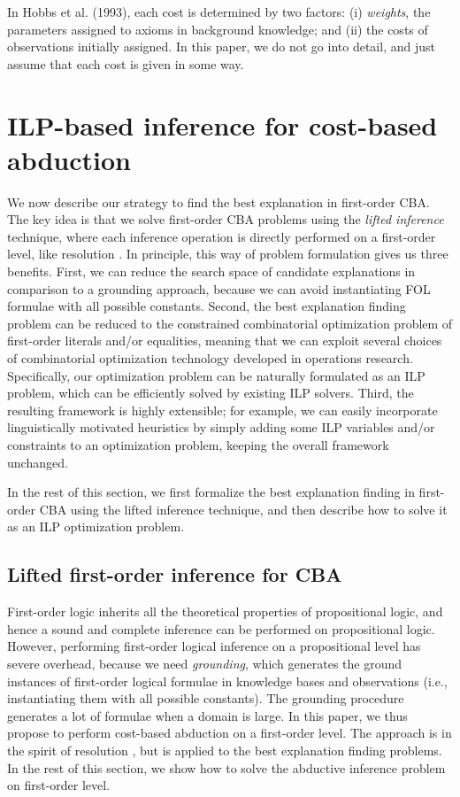 \documentclass[english]{jnlp_1.4}
\begin{document}
In Hobbs et al. (1993), each cost is determined by two factors: (i)
\emph{weights}, the parameters assigned to axioms in background
knowledge; and (ii) the costs of observations initially assigned. In
this paper, we do not go into detail, and just assume that each
cost is given in some way.


\section{ILP-based inference for cost-based abduction}
\label{sec:i_and_i}

We now describe our strategy to find the best explanation in
first-order CBA. The key idea is that we solve first-order CBA
problems using the \emph{lifted inference} technique, where each
inference operation is directly performed on a first-order level, like
resolution \cite{Robinson65}. In principle, this way of problem
formulation gives us three benefits. First, we can reduce the search
space of candidate explanations in comparison to a grounding approach,
because we can avoid instantiating FOL formulae with all
possible constants. Second, the best explanation finding problem can
be reduced to the constrained combinatorial optimization problem of
first-order literals and/or equalities, meaning that we can exploit
several choices of combinatorial optimization technology developed in
operations research. Specifically, our optimization problem can be
naturally formulated as an ILP problem,
which can be efficiently solved by existing ILP solvers. Third, the
resulting framework is highly extensible; for example, we can easily
incorporate linguistically motivated heuristics by simply adding some
ILP variables and/or constraints to an optimization problem, keeping
the overall framework unchanged.

In the rest of this section, we first formalize the best explanation
finding in first-order CBA using the lifted inference technique, and
then describe how to solve it as an ILP optimization problem.


\subsection{Lifted first-order inference for CBA}
\label{sec:liftedcba}

First-order logic inherits all the theoretical properties of
propositional logic, and hence a sound and complete inference can be
performed on propositional logic. However, performing first-order
logical inference on a propositional level has severe overhead, because
we need \emph{grounding}, which generates the ground instances of
first-order logical formulae in knowledge bases and observations
(i.e., instantiating them with all possible constants). The grounding
procedure generates a lot of formulae when a domain is
large. In this paper, we thus propose to perform cost-based
abduction on a first-order level. The approach is in the spirit of
resolution \cite{Robinson65}, but is applied to the best explanation
finding problems. 
In the rest of this section, we show how to solve the
abductive inference problem on first-order level.
\end{document}
